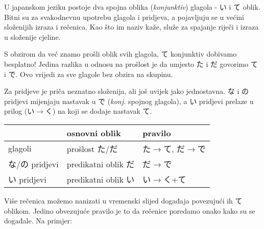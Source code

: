 

\author{Tomislav Mamić}


	
	
	U japanskom jeziku postoje dva spojna oblika (\textit{konjunktiv}) glagola - い i て oblik. Bitni su za svakodnevnu upotrebu glagola i pridjeva, a pojavljuju se u većini složenijih izraza i rečenica. Kao što im naziv kaže, služe za spajanje riječi i izraza u složenije cjeline.
	
	
	S obzirom da već znamo prošli oblik svih glagola, て konjunktiv dobivamo besplatno! Jedina razlika u odnosu na prošlost je da umjesto た i だ govorimo て i で. Ovo vrijedi za sve glagole bez obzira na skupinu.
	
	Za pridjeve je priča neznatno složenija, ali još uvijek jako jednostavna. な i の pridjevi mijenjaju nastavak u で (\textit{konj.} spojnog glagola), a い pridjevi prelaze u prilog (い$\rightarrow$く) na koji se dodaje nastavak て.
	
	\vspace{10pt}
	\begin{tabular}{|l|l|l|}
		\hline
		&osnovni oblik&pravilo\\\hline
		glagoli&prošlost た/だ&た$\rightarrow$て, だ$\rightarrow$で\\\hline
		な/の pridjevi&predikatni oblik だ&だ$\rightarrow$で\\\hline
		い pridjevi&predikatni oblik い&い$\rightarrow$く+て\\\hline
	\end{tabular}

	
	Više rečenica možemo nanizati u vremenski slijed događaja povezujući ih て oblikom. Jedino obvezujuće pravilo je to da rečenice poredamo onako kako su se događale. Na primjer:
	
	\begin{reibun}
	\end{reibun}

